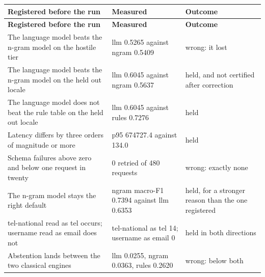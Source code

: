 \begin{longtable}{p{}p{}p{}}
\toprule
\textbf{Registered before the run} & \textbf{Measured} & \textbf{Outcome} \\
\midrule
\endfirsthead
\toprule
\textbf{Registered before the run} & \textbf{Measured} & \textbf{Outcome} \\
\midrule
\endhead
\bottomrule
\endfoot
The language model beats the n-gram model on the hostile tier & llm 0.5265 against ngram 0.5409 & wrong: it lost \\  %
The language model beats the n-gram model on the held out locale & llm 0.6045 against ngram 0.5637 & held, and not certified after correction \\  %
The language model does not beat the rule table on the held out locale & llm 0.6045 against rules 0.7276 & held \\  %
Latency differs by three orders of magnitude or more & p95 674727.4 against 134.0 & held \\  %
Schema failures above zero and below one request in twenty & 0 retried of 480 requests & wrong: exactly none \\  %
The n-gram model stays the right default & ngram macro-F1 0.7394 against llm 0.6353 & held, for a stronger reason than the one registered \\  %
tel-national read as tel occurs; username read as email does not & tel-national as tel 14; username as email 0 & held in both directions \\  %
Abstention lands between the two classical engines & llm 0.0255, ngram 0.0363, rules 0.2620 & wrong: below both \\  %
\end{longtable}
\par\smallskip{}
\par{}
